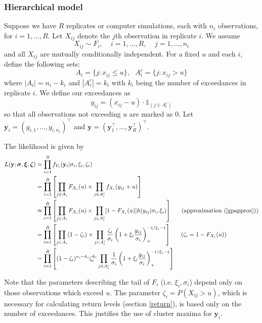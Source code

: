 \documentclass[12pt]{article}
\newcommand{\m}[1]{\mathbf{\bm{#1}}}
\newcommand{\ind}{\mathds{1}}
\begin{document}
\subsubsection{Hierarchical model}
\label{hier}

Suppose we have $R$ replicates or computer simulations, each with $n_i$ observations, for $i=1,\ldots,R$. Let $X_{ij}$ denote the $j$th observation in replicate $i$. We assume
\[ X_{ij} \sim F_i,~~~~~i=1,\ldots,R,~~~~~j=1,\ldots,n_i \]
and all $X_{ij}$ are mutually conditionally independent. For a fixed $u$ and each $i$, define the following sets:
\[ A_i = \{j:x_{ij}\leq u\},~~~ A_i^c = \{j: x_{ij}>u\} \]
where $|A_i|=n_i-k_i$ and $|A_i^c|=k_i$ with $k_i$ being the number of exceedances in replicate $i$. We define our exceedances as
\[ y_{ij} = (x_{ij}-u)\cdot \ind_{(j \in A_i^c)} \]
so that all observations not exceeding $u$ are marked as $0$. Let $\m{y}_i=(y_{i,1},\ldots,y_{i,n_i})^\top$ and $\m{y}=(\m{y}_1^\top,\ldots,\m{y}_R^\top)^\top$.

The likelihood is given by
\begin{align}
L(\m{y}; \m{\sigma}, \m{\xi}, \m{\zeta}) &= \prod_{i=1}^R f_{Y_i}(\m{y}_i|\sigma_i,\xi_i,\zeta_i) \nonumber \\
&= \prod_{i=1}^R\left[\prod_{j\in A_i} F_{X_i}(u) \times \prod_{j\in A_i^c} f_{X_i}(y_{ij}+u)\right] \nonumber \\
&\approx \prod_{i=1}^R\left[\prod_{j\in A_i} F_{X_i}(u) \times \prod_{j\in A_i^c} [1-F_{X_i}(u)]h(y_{ij}|\sigma_i,\xi_i)\right]~~~~~\mathrm{(approximation~(\ref{gpapprox}))} \nonumber \\
&= \prod_{i=1}^R\left[\prod_{j\in A_i} (1-\zeta_i)\times \prod_{j\in A_i^c} \frac{\zeta_i}{\sigma_i}\left(1+\xi_i\frac{y_{ij}}{\sigma_i}\right)_+^{-1/\xi_i-1}\right]~~~~~(\zeta_i=1-F_{X_i}(u)) \nonumber \\
&= \prod_{i=1}^R\left[(1-\zeta_i)^{n_i-k_i}\zeta_i^{k_i}\prod_{j\in A_i^c}\frac{1}{\sigma_i}\left(1+\xi_i\frac{y_{ij}}{\sigma_i}\right)_+^{-1/\xi_i-1}\right] \label{biglike}
\end{align}

Note that the parameters describing the tail of $F_i$ (i.e. $\xi_i,\sigma_i$) depend only on those observations which exceed $u$. The parameter $\zeta_i=P(X_{ij}>u)$, which is necessary for calculating return levels (section \ref{return}), is based only on the number of exceedances. This justifies the use of cluster maxima for $\m{y}_i$.
\end{document}
